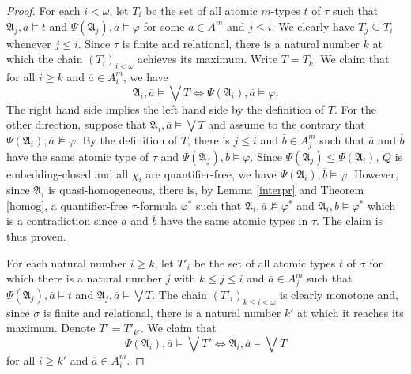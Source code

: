 \documentclass{ndjflart}
\theoremstyle{plain}
\theoremstyle{definition}
\numberwithin{equation}{section}
\begin{document}
\begin{proof}
For each $i < \omega$, let $T_i$ be the set of all atomic
$m$-types $t$ of $\tau$
such that $\mathfrak{A}_j, \overline{a} \vDash t$
and $\Psi(\mathfrak{A}_j), \overline{a} \vDash \varphi$
for some $\overline{a} \in A^m$ and $j \leq i$.
We clearly have $T_j \subseteq T_i$ whenever $j \leq i$.
Since $\tau$ is finite and relational, there is a natural number $k$
at which the chain $(T_i)_{i < \omega}$ achieves its maximum.
Write $T = T_k$.
We claim that for all $i \geq k$ and $\overline{a} \in A_i^m$, we have
\begin{equation}\label{eq_0}
\mathfrak{A}_i, \overline{a} \vDash \bigvee T
\Leftrightarrow
\Psi(\mathfrak{A}_i), \overline{a} \vDash \varphi.
\end{equation}
The right hand side implies the left hand side by the
definition of $T$.
For the other direction, suppose that
$\mathfrak{A}_i, \overline{a} \vDash \bigvee T$
and assume to the contrary that
$\Psi(\mathfrak{A}_i), \overline{a} \nvDash \varphi$.
By the definition of $T$, there is $j \leq i$ and $\overline{b} \in A_j^m$
such that $\overline{a}$ and $\overline{b}$ have the same atomic type of $\tau$
and $\Psi(\mathfrak{A}_j), \overline{b} \vDash \varphi$.
Since $\Psi(\mathfrak{A}_j) \leq \Psi(\mathfrak{A}_i)$, $Q$ is embedding-closed
and all $\chi_i$ are quantifier-free, we have
$\Psi(\mathfrak{A}_i), \overline{b} \vDash \varphi$.
However, since $\mathfrak{A}_i$ is quasi-homogeneous,
there is, by Lemma \ref{interpr} and Theorem \ref{homog}, 
a quantifier-free $\tau$-formula
$\varphi^*$ such that
$\mathfrak{A}_i, \overline{a} \nvDash \varphi^*$
and $\mathfrak{A}_i, \overline{b} \vDash \varphi^*$
which is a contradiction since $\overline{a}$ and $\overline{b}$ have the
same atomic types in $\tau$.
The claim is thus proven.

For each natural number $i \geq k$,
let $T'_i$ be the set of all atomic types $t$ of $\sigma$
for which there is a natural number $j$ with
$k \leq j \leq i$ and $\overline{a} \in A^m_j$ such that
$\Psi(\mathfrak{A}_j), \overline{a} \vDash t$ and
$\mathfrak{A}_j, \overline{a} \vDash \bigvee T$.
The chain $(T'_i)_{k \leq i < \omega}$ is clearly monotone and, 
since $\sigma$ is finite and relational, 
there is a natural number $k'$ at which it reaches its maximum.
Denote $T' = T'_{k'}$.
We claim that
\begin{equation}\label{eq_1}
\Psi(\mathfrak{A}_i), \overline{a} \vDash \bigvee T' \Leftrightarrow
\mathfrak{A}_i, \overline{a} \vDash \bigvee T
\end{equation}
for all $i \geq k'$ and $\overline{a} \in A_i^m$.


\end{proof}
\end{document}
